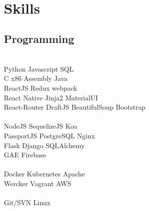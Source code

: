 \documentclass[]{deedy-resume-openfont}
\begin{document}
\begin{minipage}[t]{0.31\textwidth}
\\[1\baselineskip]


\section{Skills}
\subsection{Programming}
\\[1\baselineskip]

Python \textbullet{} Javascript \textbullet{}  SQL
\\[1\baselineskip]

 C \textbullet{} x86 Assembly \textbullet{} Java
\\[1\baselineskip]

ReactJS \textbullet{} Redux \textbullet{} webpack \\ 
React Native \textbullet{} Jinja2 \textbullet{} MaterialUI \\
React-Router \textbullet{} DraftJS \textbullet{}
BeautifulSoup \textbullet{} Bootstrap \\
\\[1\baselineskip]

NodeJS \textbullet{} SequelizeJS \textbullet{} Koa\\
PassportJS \textbullet{} PostgreSQL \textbullet{} Nginx \\
Flask \textbullet{} Django \textbullet{} SQLAlchemy \\
GAE \textbullet{} Firebase \\
\\[1\baselineskip]



Docker \textbullet{} Kubernetes \textbullet{} Apache \\
Wercker \textbullet{} Vagrant \textbullet{} AWS \\
\\[1\baselineskip]

Git/SVN \textbullet{} Linux \\
\\[1\baselineskip]


\end{minipage}
\end{document}
